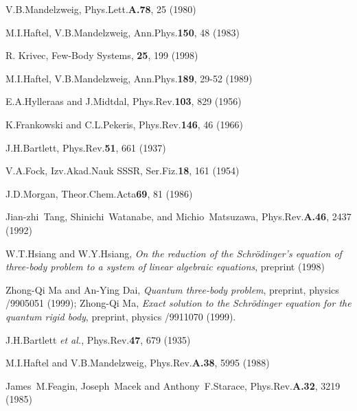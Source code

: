 \begin{thebibliography}{99}

 V.B.Mandelzweig, Phys.Lett.{\bf A.78}, 25 (1980)

 M.I.Haftel, V.B.Mandelzweig, Ann.Phys.{\bf 150}, 48 (1983)

 R. Krivec, Few-Body Systems, {\bf 25}, 199 (1998)

 M.I.Haftel, V.B.Mandelzweig, Ann.Phys.{\bf 189}, 29-52 (1989)

 E.A.Hylleraas and J.Midtdal, Phys.Rev.{\bf 103}, 829 (1956)

 K.Frankowski and C.L.Pekeris, Phys.Rev.{\bf 146}, 46 (1966)

 J.H.Bartlett, Phys.Rev.{\bf 51}, 661 (1937)

 V.A.Fock, Izv.Akad.Nauk SSSR, Ser.Fiz.{\bf 18}, 161 (1954)

 J.D.Morgan, Theor.Chem.Acta{\bf 69}, 81 (1986)

 Jian-zhi~Tang, Shinichi~Watanabe, and Michio~Matsuzawa,
Phys.Rev.{\bf A.46}, 2437 (1992)

 W.T.Hsiang and W.Y.Hsiang, {\it On the reduction of the
Schr\"{o}dinger's equation of three-body problem to a system of linear
algebraic equations}, preprint (1998)

 Zhong-Qi Ma and An-Ying Dai, {\it Quantum three-body problem},
preprint, physics /9905051 (1999); Zhong-Qi Ma, {\it Exact solution to the
Schr\"{o}dinger equation for the quantum rigid body},
preprint, physics /9911070 (1999).

 J.H.Bartlett {\it et al.}, Phys.Rev.{\bf 47}, 679 (1935)

 M.I.Haftel and V.B.Mandelzweig, Phys.Rev.{\bf A.38}, 5995 (1988)

 James~M.Feagin, Joseph~Macek and Anthony~F.Starace,
Phys.Rev.{\bf A.32}, 3219 (1985)
\end{thebibliography}



